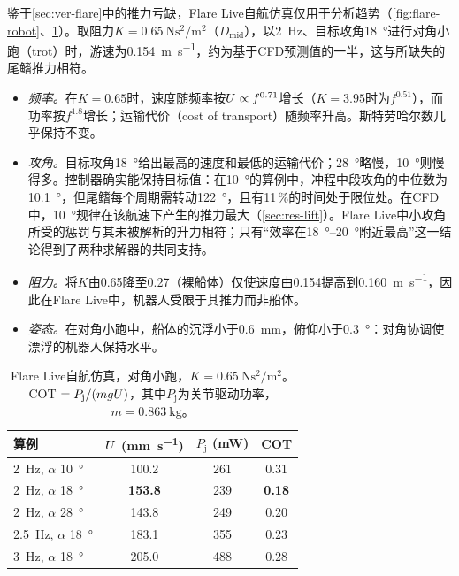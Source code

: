 鉴于\cref{sec:ver-flare}中的推力亏缺，Flare Live自航仿真仅用于分析趋势（\cref{fig:flare-robot}、\cref{tab:flare}）。取阻力$K=\SI{0.65}{\newton\second\squared\per\metre\squared}$（$D_\text{mid}$），以\SI{2}{\hertz}、目标攻角\SI{18}{\degree}进行对角小跑（trot）时，游速为\SI{0.154}{\metre\per\second}，约为基于CFD预测值的一半，这与所缺失的尾鳍推力相符。
\begin{itemize}
  \item \emph{频率。}在$K=0.65$时，速度随频率按$U\propto f^{0.71}$增长（$K=3.95$时为$f^{0.51}$），而功率按$f^{1.8}$增长；运输代价（cost of transport）随频率升高。斯特劳哈尔数几乎保持不变。
  \item \emph{攻角。}目标攻角\SI{18}{\degree}给出最高的速度和最低的运输代价；\SI{28}{\degree}略慢，\SI{10}{\degree}则慢得多。控制器确实能保持目标值：在\SI{10}{\degree}的算例中，冲程中段攻角的中位数为\SI{10.1}{\degree}，但尾鳍每个周期需转动\SI{122}{\degree}，且有11\,\%的时间处于限位处。在CFD中，\SI{10}{\degree}规律在该航速下产生的推力最大（\cref{sec:res-lift}）。Flare Live中小攻角所受的惩罚与其未被解析的升力相符；只有“效率在\SIrange{18}{20}{\degree}附近最高”这一结论得到了两种求解器的共同支持。
  \item \emph{阻力。}将$K$由0.65降至0.27（裸船体）仅使速度由\SI{0.154}{}提高到\SI{0.160}{\metre\per\second}，因此在Flare Live中，机器人受限于其推力而非船体。
  \item \emph{姿态。}在对角小跑中，船体的沉浮小于\SI{0.6}{\milli\metre}，俯仰小于\SI{0.3}{\degree}：对角协调使漂浮的机器人保持水平。
\end{itemize}

\begin{table}[t]
  \centering
  \caption[Flare Live自航仿真]{Flare Live自航仿真，对角小跑，$K=\SI{0.65}{\newton\second\squared\per\metre\squared}$。COT $=P_\text{j}/(mgU)$，其中$P_\text{j}$为关节驱动功率，$m=\SI{0.863}{\kilo\gram}$。}
  \label{tab:flare}
  \small
  \begin{tabular}{@{}lccc@{}}
    \toprule
    算例 & $U$ (\si{\milli\metre\per\second}) & $P_\text{j}$ (mW) & COT \\
    \midrule
    \SI{2}{\hertz}, $\alpha$ \SI{10}{\degree} & 100.2 & 261 & 0.31 \\
    \SI{2}{\hertz}, $\alpha$ \SI{18}{\degree} & \textbf{153.8} & 239 & \textbf{0.18} \\
    \SI{2}{\hertz}, $\alpha$ \SI{28}{\degree} & 143.8 & 249 & 0.20 \\
    \SI{2.5}{\hertz}, $\alpha$ \SI{18}{\degree} & 183.1 & 355 & 0.23 \\
    \SI{3}{\hertz}, $\alpha$ \SI{18}{\degree} & 205.0 & 488 & 0.28 \\
    \bottomrule
  \end{tabular}
\end{table}

